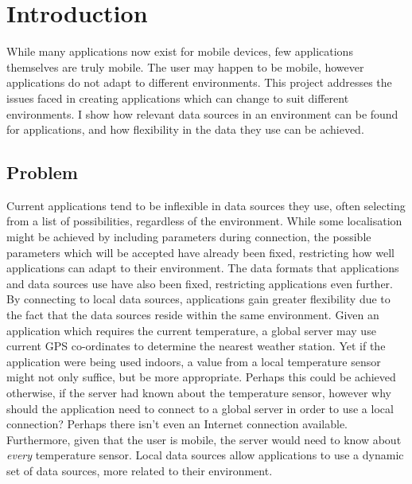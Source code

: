 \documentclass[12pt,twoside,notitlepage]{report}
\begin{document}
\bigskip
{}

\cleardoublepage

\tableofcontents

\listoffigures

\newpage


\cleardoublepage        %

\setcounter{page}{1}
\pagestyle{headings}

\chapter{Introduction}

While many applications now exist for mobile devices, few applications themselves are truly mobile. 
The user may happen to be mobile, however applications do not adapt to different environments. 
This project addresses the issues faced in creating applications which can change to suit different environments. 
I show how relevant data sources in an environment can be found for applications, and how flexibility in the data they use can be achieved. 

\section{Problem}

Current applications tend to be inflexible in data sources they use, often selecting from a list of possibilities, regardless of the environment. 
While some localisation might be achieved by including parameters during connection, the possible parameters which will be accepted have already been fixed, restricting how well applications can adapt to their environment. 
The data formats that applications and data sources use have also been fixed, restricting applications even further.
By connecting to local data sources, applications gain greater flexibility due to the fact that the data sources reside within the same environment.
Given an application which requires the current temperature, a global server may use current GPS co-ordinates to determine the nearest weather station. 
Yet if the application were being used indoors, a value from a local temperature sensor might not only suffice, but be more appropriate. 
Perhaps this could be achieved otherwise, if the server had known about the temperature sensor, however why should the application need to connect to a global server in order to use a local connection? Perhaps there isn't even an Internet connection available. 
Furthermore, given that the user is mobile, the server would need to know about {\sl every} temperature sensor. 
Local data sources allow applications to use a dynamic set of data sources, more related to their environment. 
\end{document}
